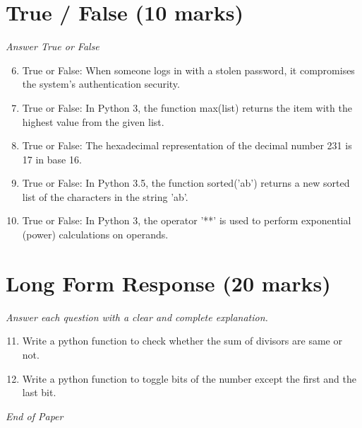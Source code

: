 \documentclass[12pt]{article}
\begin{document}
\section*{True / False (10 marks)}
\textit{Answer True or False}
\begin{enumerate}[label=\arabic*.]
\setcounter{enumi}{5}
\item True or False: When someone logs in with a stolen password, it compromises the system's authentication security.
\item True or False: In Python 3, the function max(list) returns the item with the highest value from the given list.
\item True or False: The hexadecimal representation of the decimal number 231 is 17 in base 16.
\item True or False: In Python 3.5, the function sorted('ab') returns a new sorted list of the characters in the string 'ab'.
\item True or False: In Python 3, the operator '**' is used to perform exponential (power) calculations on operands.
\end{enumerate}

\section*{Long Form Response (20 marks)}
\textit{Answer each question with a clear and complete explanation.}
\begin{enumerate}[label=\arabic*.]
\setcounter{enumi}{10}
\item Write a python function to check whether the sum of divisors are same or not.
\item Write a python function to toggle bits of the number except the first and the last bit.
\end{enumerate}

\vfill
\noindent\textit{End of Paper}
\end{document}
